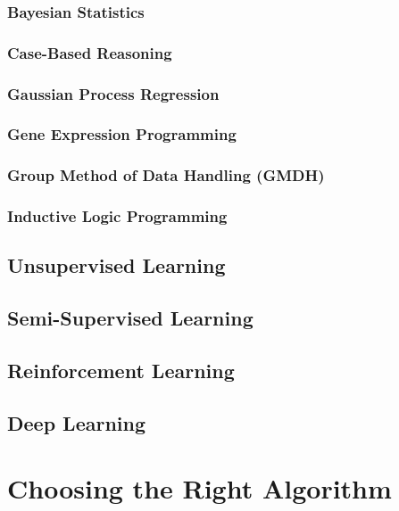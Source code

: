 \documentclass{report}
\begin{document}
	\subsection{Bayesian Statistics}
	\label{subsec:bayesian_statistics}

	\subsection{Case-Based Reasoning}
	\subsection{Gaussian Process Regression}
	\subsection{Gene Expression Programming}
	\subsection{Group Method of Data Handling (GMDH)}
	\subsection{Inductive Logic Programming}

	
\section{Unsupervised Learning}

\section{Semi-Supervised Learning}

\section{Reinforcement Learning}

\section{Deep Learning}

\chapter{Choosing the Right Algorithm}
\end{document}
